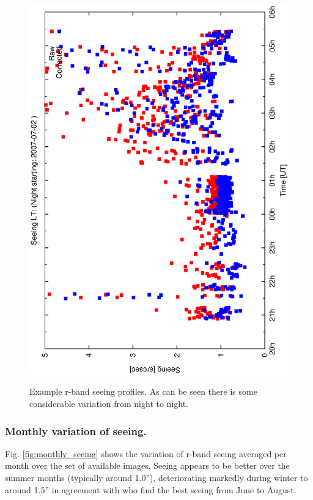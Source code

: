 {{\begin{figure}[htbp]
\begin{center}
{    \includegraphics[scale=0.25, angle=-90]{figures/ecs/see_profile_2007_07_02.eps}
    \label{fig:see_profile_2007_07_02}
  }
\end{center}  
\caption[Examples of r-band seeing profiles]{Example r-band seeing profiles. As can be seen there is some considerable variation from night to night.}
\label{fig:see_profile_examples}
\end{figure}

\subsubsection{Monthly variation of seeing.}

Fig. \ref{fig:monthly_seeing} shows the variation of r-band seeing averaged per month over the set of available images. Seeing appears to be better over the summer months (typically around 1.0''), deteriorating markedly during winter to around 1.5'' in agreement with \citet{munoz97nighttime} who find the best seeing from June to August. 

}}
